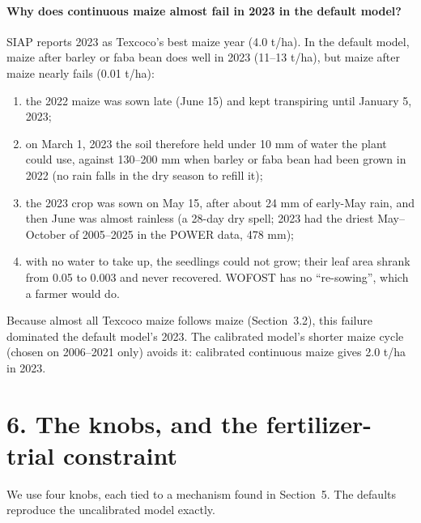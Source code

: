 \documentclass[11pt,a4paper]{article}
\begin{document}
\paragraph{Why does continuous maize almost fail in 2023 in the default model?} SIAP reports 2023 as Texcoco's best
maize year (4.0 t/ha). In the default model, maize after barley or faba bean does well in 2023 (11--13 t/ha), but
maize after maize nearly fails (0.01 t/ha):
\begin{enumerate}[nosep]
  \item the 2022 maize was sown late (June 15) and kept transpiring until January 5, 2023;
  \item on March 1, 2023 the soil therefore held under 10 mm of water the plant could use, against 130--200 mm when
        barley or faba bean had been grown in 2022 (no rain falls in the dry season to refill it);
  \item the 2023 crop was sown on May 15, after about 24 mm of early-May rain, and then June was almost rainless
        (a 28-day dry spell; 2023 had the driest May--October of 2005--2025 in the POWER data, 478 mm);
  \item with no water to take up, the seedlings could not grow; their leaf area shrank from 0.05 to 0.003 and never
        recovered. WOFOST has no ``re-sowing'', which a farmer would do.
\end{enumerate}
Because almost all Texcoco maize follows maize (Section~3.2), this failure dominated the default model's 2023. The
calibrated model's shorter maize cycle (chosen on 2006--2021 only) avoids it: calibrated continuous maize gives
2.0 t/ha in 2023.

\section*{6. The knobs, and the fertilizer-trial constraint}

We use four knobs, each tied to a mechanism found in Section~5. The defaults reproduce the uncalibrated model
exactly.
\end{document}
